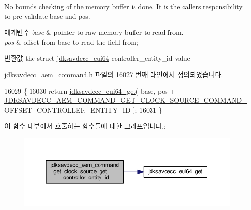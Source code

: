 No bounds checking of the memory buffer is done. It is the caller\textquotesingle{}s responsibility to pre-\/validate base and pos.


\begin{DoxyParams}{매개변수}
{\em base} & pointer to raw memory buffer to read from. \\
\hline
{\em pos} & offset from base to read the field from; \\
\hline
\end{DoxyParams}
\begin{DoxyReturn}{반환값}
the struct \hyperlink{structjdksavdecc__eui64}{jdksavdecc\+\_\+eui64} controller\+\_\+entity\+\_\+id value 
\end{DoxyReturn}


jdksavdecc\+\_\+aem\+\_\+command.\+h 파일의 16027 번째 라인에서 정의되었습니다.


\begin{DoxyCode}
16029 \{
16030     \textcolor{keywordflow}{return} \hyperlink{group__eui64_ga2652311a25a6b91cddbed75c108c7031}{jdksavdecc\_eui64\_get}( base, pos + 
      \hyperlink{group__command__get__clock__source_ga55aa103afc89a432930dffe5d9b39101}{JDKSAVDECC\_AEM\_COMMAND\_GET\_CLOCK\_SOURCE\_COMMAND\_OFFSET\_CONTROLLER\_ENTITY\_ID}
       );
16031 \}
\end{DoxyCode}


이 함수 내부에서 호출하는 함수들에 대한 그래프입니다.\+:
\nopagebreak
\begin{figure}[H]
\begin{center}
\leavevmode
\includegraphics[width=350pt]{group__command__get__clock__source_ga6c35231c762b71df4bb61dac807ac20d_cgraph}
\end{center}
\end{figure}


